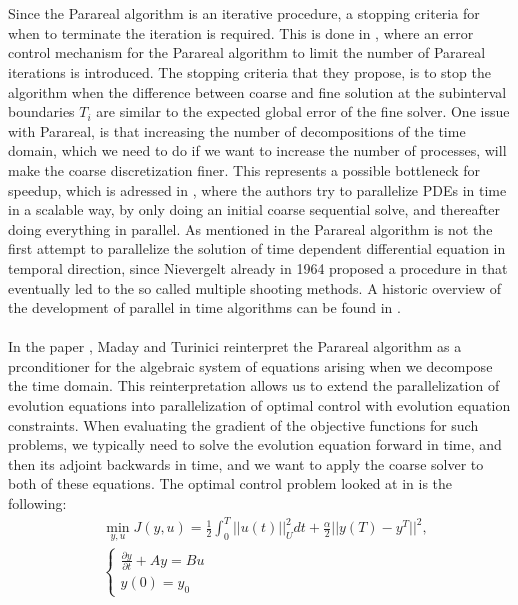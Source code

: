 \\
\\
Since the Parareal algorithm is an iterative procedure, a stopping criteria for when to terminate the iteration is required. This is done in \cite{lepsa2010efficient}, where an error control mechanism for the Parareal algorithm to limit the number of Parareal iterations is introduced. The stopping criteria that they propose, is to stop the algorithm when the difference between coarse and fine solution at the subinterval boundaries $T_i$ are similar to the expected global error of the fine solver. One issue with Parareal, is that increasing the number of decompositions of the time domain, which we need to do if we want to increase the number of processes, will make the coarse discretization finer. This represents a possible bottleneck for speedup, which is adressed in \cite{rao2014adjoint}, where the authors try to parallelize PDEs in time in a scalable way, by only doing an initial coarse sequential solve, and thereafter doing everything in parallel. As mentioned in \cite{gander2007superlinear} the Parareal algorithm is not the first attempt to parallelize the solution of time dependent differential equation in temporal direction, since Nievergelt already in 1964 proposed a procedure in \cite{nievergelt1964parallel} that eventually led to the so called multiple shooting methods. A historic overview of the development of parallel in time algorithms can be found in \cite{gander201550}.
\\
\\
In the paper \cite{maday2002parareal}, Maday and Turinici reinterpret the Parareal algorithm as a prconditioner for the algebraic system of equations arising when we decompose the time domain. This reinterpretation allows us to extend the parallelization of evolution equations into parallelization of optimal control with evolution equation constraints. When evaluating the gradient of the objective functions for such problems, we typically need to solve the evolution equation forward in time, and then its adjoint backwards in time, and we want to apply the coarse solver to both of these equations. The optimal control problem looked at in \cite{maday2002parareal} is the following:
\begin{align*}
&\min_{y,u}J(y,u) = \frac{1}{2}\int_0^T||u(t)||_U^2dt + \frac{\alpha}{2}||y(T)-y^T||^2,\\
&\left\{
     \begin{array}{lr}
       	\frac{\partial y}{\partial t}+Ay = Bu\\
       	   y(0)=y_0
     \end{array}
   \right.
\end{align*}
